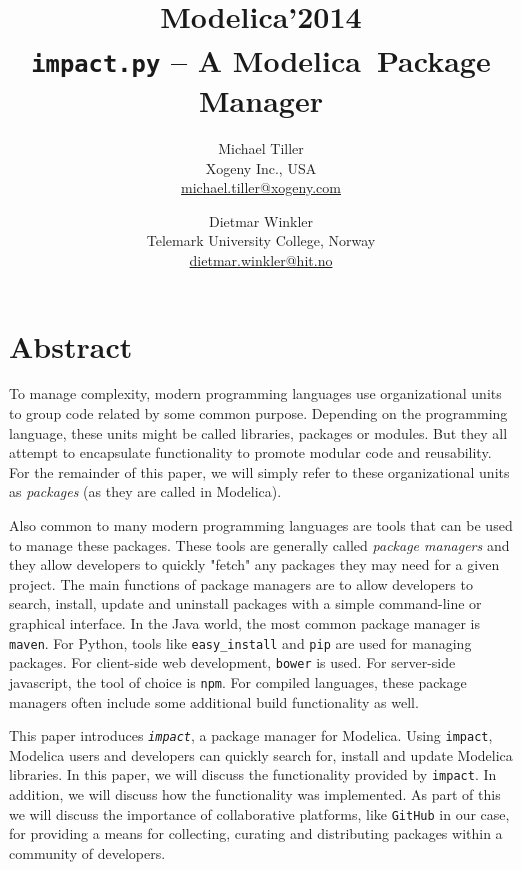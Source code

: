 \documentclass[11pt,a4paper,twocolumn]{article}
\newcommand{\myr}{\textsuperscript{\textregistered}}
\newcommand{\code}[1]{\texttt{#1}} %
\begin{document}
\title{\textbf{{\small Modelica'2014}\\
    \code{impact.py} -- A Modelica\myr\ Package Manager}}

\author{Michael Tiller\\Xogeny Inc., USA\\\url{michael.tiller@xogeny.com} %
        \and Dietmar Winkler\\Telemark University College, Norway\\\url{dietmar.winkler@hit.no}}
\date{} %
\maketitle\thispagestyle{empty} %

\section*{Abstract}

To manage complexity, modern programming languages use organizational
units to group code related by some common purpose.  Depending on the
programming language, these units might be called libraries, packages
or modules.  But they all attempt to encapsulate functionality to
promote modular code and reusability.  For the remainder of this
paper, we will simply refer to these organizational units as
\emph{packages} (as they are called in Modelica).

Also common to many modern programming languages are tools that can be
used to manage these packages.  These tools are generally called
\emph{package managers} and they allow developers to quickly "fetch" any
packages they may need for a given project.  The main functions of
package managers are to allow developers to search, install, update
and uninstall packages with a simple command-line or graphical
interface.  In the Java world, the most common package manager is
\code{maven}.  For Python, tools like \code{easy\_install} and \code{pip} are
used for managing packages.  For client-side web development,
\code{bower} is used.  For server-side javascript, the tool of choice is
\code{npm}.  For compiled languages, these package managers often
include some additional build functionality as well.

This paper introduces \emph{\code{impact}}, a package manager for Modelica.
  Using \code{impact}, Modelica users and developers can quickly search
  for, install and update Modelica libraries.  In this paper, we will
  discuss the functionality provided by \code{impact}.  In addition, we
  will discuss how the functionality was implemented.  As part of this
  we will discuss the importance of collaborative platforms, like
  \code{GitHub} in our case, for providing a means for collecting,
  curating and distributing packages within a community of developers.
\end{document}

